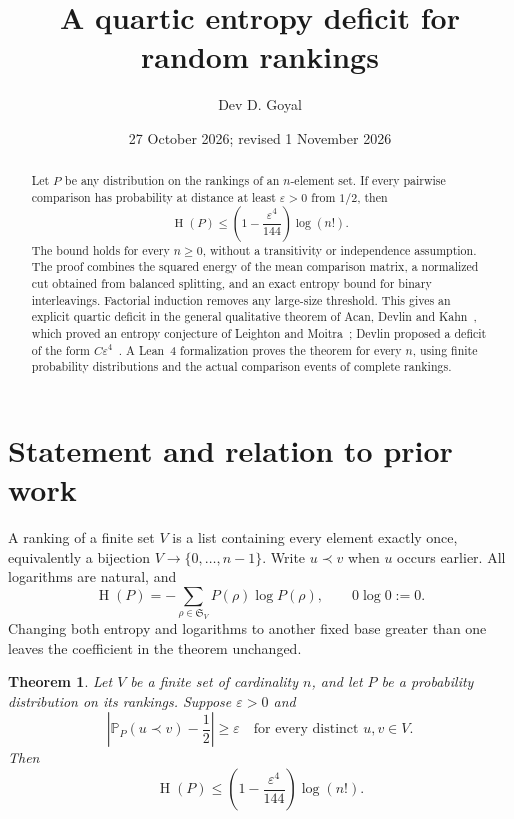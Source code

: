 \documentclass[11pt,a4paper]{article}
\title{A quartic entropy deficit for random rankings}
\author{Dev D. Goyal}
\date{27 October 2026; revised 1 November 2026}
\newtheorem{theorem}{Theorem}
\newcommand{\Prb}{\mathbb P}
\newcommand{\Sset}{\mathfrak S}
\newcommand{\eps}{\varepsilon}
\DeclareMathOperator{\Ent}{H}
\begin{document}
\maketitle
\begin{abstract}
Let $P$ be any distribution on the rankings of an $n$-element set. If every
pairwise comparison has probability at distance at least $\eps>0$ from $1/2$,
then
\[
\Ent(P)\leq \left(1-\frac{\eps^4}{144}\right)\log(n!).
\]
The bound holds for every $n\geq0$, without a transitivity or independence
assumption. The proof combines the squared energy of the mean comparison
matrix, a normalized cut obtained from balanced splitting, and an exact
entropy bound for binary interleavings. Factorial induction removes any
large-size threshold. This gives an explicit quartic deficit in the general
qualitative theorem of Acan, Devlin and Kahn~\cite{ADK}, which proved an
entropy conjecture of Leighton and Moitra~\cite{LM}; Devlin proposed a
deficit of the form $C\eps^4$~\cite{Devlin}. A Lean~4 formalization proves
the theorem for every $n$, using finite probability distributions and the
actual comparison events of complete rankings.
\end{abstract}

\section{Statement and relation to prior work}

A ranking of a finite set $V$ is a list containing every element exactly once,
equivalently a bijection $V\to\{0,\ldots,n-1\}$. Write $u\prec v$ when $u$
occurs earlier. All logarithms are natural, and
\[
\Ent(P)=-\sum_{\rho\in\Sset_V} P(\rho)\log P(\rho),\qquad 0\log0:=0.
\]
Changing both entropy and logarithms to another fixed base greater than one leaves the
coefficient in the theorem unchanged.

\begin{theorem}\label{thm:main}
Let $V$ be a finite set of cardinality $n$, and let $P$ be a probability
distribution on its rankings. Suppose $\eps>0$ and
\begin{equation}\label{eq:bias}
\left|\Prb_P(u\prec v)-\frac12\right|\geq\eps
\quad\text{for every distinct }u,v\in V.
\end{equation}
Then
\begin{equation}\label{eq:main}
\Ent(P)\leq\left(1-\frac{\eps^4}{144}\right)\log(n!).
\end{equation}
\end{theorem}
\end{document}
